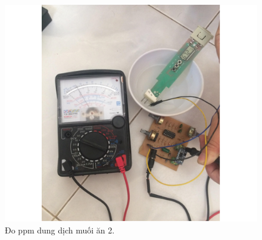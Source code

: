 \documentclass[a4paper,12pt,oneside]{article}
\begin{document}
\begin{itemize}
\begin{itemize}
	\begin{figure}[H]
	\centering
	\includegraphics[scale=.8]{hinh/PPM/nacl_2.PNG}
	\caption{Đo ppm dung dịch muối ăn 2.}
	\end{figure}
	

\end{itemize}
\end{itemize}
\end{document}
